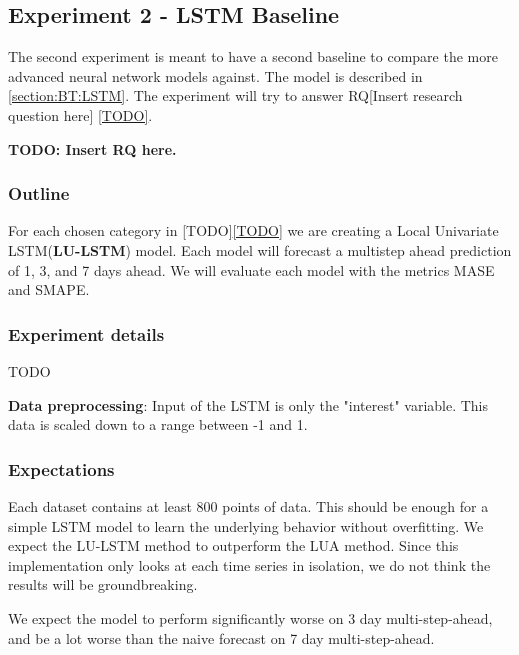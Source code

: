 \subsection{Experiment 2 - LSTM Baseline}
\label{section:Method:LSTM}
The second experiment is meant to have a second baseline to compare the more
advanced neural network models against. The model is described in
\cref{section:BT:LSTM}. The experiment will try to answer
RQ[Insert research question here] \cref{TODO}.


\textbf{TODO: Insert RQ here.}

\subsubsection{Outline}
For each chosen category in [TODO]\cref{TODO} we are creating a Local Univariate LSTM(\textbf{LU-LSTM})
model. Each model will forecast a multistep ahead prediction of 1, 3, and 7 days ahead.
We will evaluate each model with the metrics MASE and SMAPE.

\subsubsection{Experiment details}
TODO

\textbf{Data preprocessing}: Input of the LSTM is only the "interest" variable.
This data is scaled down to a range between -1 and 1.

\subsubsection{Expectations}
Each dataset contains at least 800 points of data.
This should be enough for a simple LSTM model to learn the underlying
behavior without overfitting. We expect the LU-LSTM method to outperform the LUA method.
Since this implementation only looks at each time series in isolation, we do
not think the results will be groundbreaking.

We expect the model to perform significantly worse on 3 day multi-step-ahead,
and be a lot worse than the naive forecast on 7 day multi-step-ahead.



